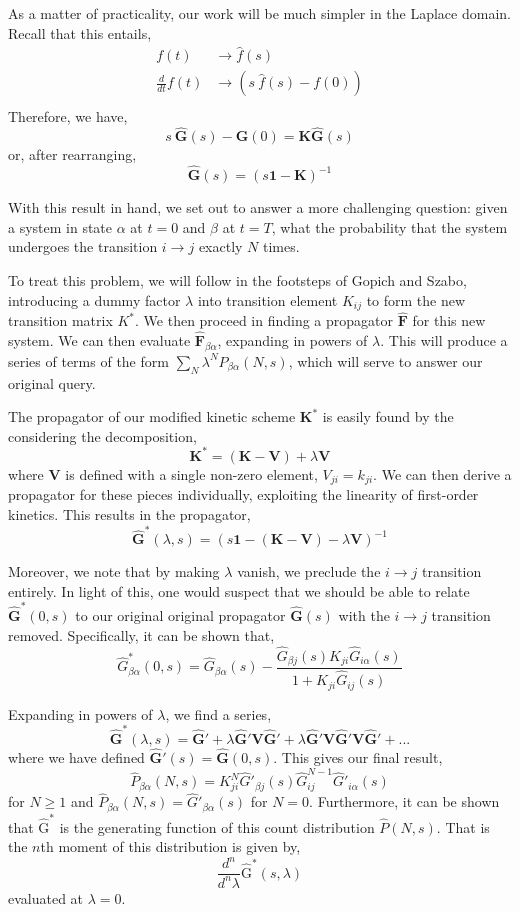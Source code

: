 \documentclass{article}
\begin{document}
As a matter of practicality, our work will be much simpler in the
Laplace domain. Recall that this entails,
\begin{align*}
f(t) & \rightarrow \hat f(s) \\
\frac{d}{dt} f(t) & \rightarrow (s~ \hat f(s) - f(0)) \\
\end{align*}
Therefore, we have,
\[ s~\mathbf{\hat G}(s) - \mathbf{G}(0) = \mathbf{K} \mathbf{\hat G}(s) \]
or, after rearranging,
\[ \mathbf{\hat G}(s) = (s \mathbf{1} - \mathbf{K})^{-1} \]

With this result in hand, we set out to answer a more challenging
question: given a system in state $\alpha$ at $t=0$ and $\beta$ at
$t=T$, what the probability that the system undergoes the transition
$i \rightarrow j$ exactly $N$ times.

To treat this problem, we will follow in the footsteps of Gopich and
Szabo\cite{Gopich2003}, introducing a dummy factor $\lambda$ into
transition element $K_{ij}$ to form the new transition matrix $K^*$.
We then proceed in finding a propagator $\mathbf{\hat F}$ for this new
system. We can then evaluate $\mathbf{\hat F}_{\beta\alpha}$,
expanding in powers of $\lambda$. This will produce a series of terms
of the form $\sum_N \lambda^N P_{\beta\alpha}(N, s)$, which will serve
to answer our original query.

The propagator of our modified kinetic scheme $\mathbf{K}^*$ is easily
found by the considering the decomposition,
\[ \mathbf{K}^* = (\mathbf{K} - \mathbf{V}) + \lambda \mathbf{V} \]
where $\mathbf V$ is defined with a single non-zero element, $V_{ji} =
k_{ji}$. 
We can then derive a propagator for these pieces
individually, exploiting the linearity of first-order kinetics.
This results in the propagator,
\[ \mathbf{\hat G}^*(\lambda, s) = \left(s \mathbf{1} - (\mathbf{K} - \mathbf{V}) - \lambda \mathbf{V} \right)^{-1} \]

Moreover, we note that by making $\lambda$ vanish, we preclude the $i
\rightarrow j$ transition entirely. In light of this, one would suspect that we should
be able to relate $\mathbf{\hat G^*}(0, s)$ to our original original
propagator $\mathbf{\hat G}(s)$ with the $i \rightarrow j$ transition
removed. Specifically, it can be shown that,
\[ \hat G^*_{\beta\alpha}(0, s) = \hat G_{\beta\alpha}(s) -
\frac{\hat G_{\beta j}(s) K_{ji} \hat G_{i\alpha}(s)}{1 + K_{ji} \hat G_{ij}(s)}
\]

Expanding in powers of $\lambda$, we find a series,
\[ \mathbf{\hat G}^*(\lambda, s) = \mathbf{\hat G'}
  + \lambda \mathbf{\hat G'} \mathbf{V} \mathbf{\hat G'}
  + \lambda \mathbf{\hat G'} \mathbf{V} \mathbf{\hat G'} \mathbf{V} \mathbf{\hat G'}
  + ...
\]
where we have defined $\mathbf{\hat G'}(s) = \mathbf{\hat G}(0, s)$.
This gives our final result,
\[ \hat P_{\beta\alpha}(N,s) = K_{ji}^N \hat G'_{\beta j}(s) \hat G_{ij}^{N-1} \hat G'_{i\alpha}(s) \]
for $N \ge 1$ and $\hat P_{\beta\alpha}(N,s) = \hat
G'_{\beta\alpha}(s)$ for $N=0$. Furthermore, it can be shown that $\mathrm{\hat G^*}$ is the generating function of this count distribution $\hat P(N,s)$. That is the $n$th moment of this
distribution is given by,
\[ \frac{d^n}{d^n \lambda} \mathrm{\hat G^*}(s, \lambda) \]
evaluated at $\lambda = 0$.
\end{document}
